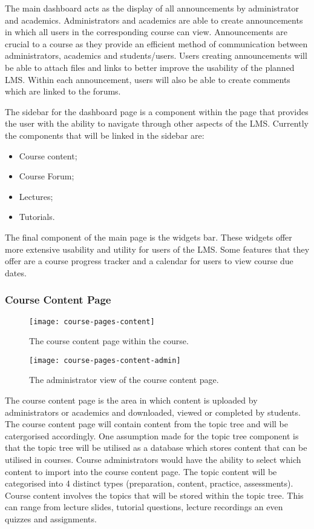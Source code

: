 The main dashboard acts as the display of all announcements by administrator and academics. Administrators and academics are able to create announcements in which all users in the corresponding course can view. 
Announcements are crucial to a course as they provide an efficient method of communication between administrators, academics and students/users.
Users creating announcements will be able to attach files and links to better improve the usability of the planned LMS.
Within each announcement, users will also be able to create comments which are linked to the forums.

The sidebar for the dashboard page is a component within the page that provides the user with the ability to navigate through other aspects of the LMS.
Currently the components that will be linked in the sidebar are:
\begin{itemize}
    \item Course content;
    \item Course Forum;
    \item Lectures;
    \item Tutorials.
\end{itemize}

The final component of the main page is the widgets bar. These widgets offer more extensive usability and utility for users of the LMS.
Some features that they offer are a course progress tracker and a calendar for users to view course due dates. 

\subsubsection{Course Content Page}
\begin{figure}[h]
    \centering
    \texttt{[image: course-pages-content]}
    \caption{The course content page within the course.}
\end{figure}
\begin{figure}[h]
    \centering
    \texttt{[image: course-pages-content-admin]}
    \caption{The administrator view of the course content page.}
\end{figure}
The course content page is the area in which content is uploaded by administrators or academics and downloaded, viewed or completed by students.
The course content page will contain content from the topic tree and will be catergorised accordingly. 
One assumption made for the topic tree component is that the topic tree will be utilised as a database which stores content that can be utilised in courses.
Course administrators would have the ability to select which content to import into the course content page. 
The topic content will be categorised into 4 distinct types (preparation, content, practice, assessments).
Course content involves the topics that will be stored within the topic tree. This can range from lecture slides, tutorial questions, lecture recordings an even quizzes and assignments. 

